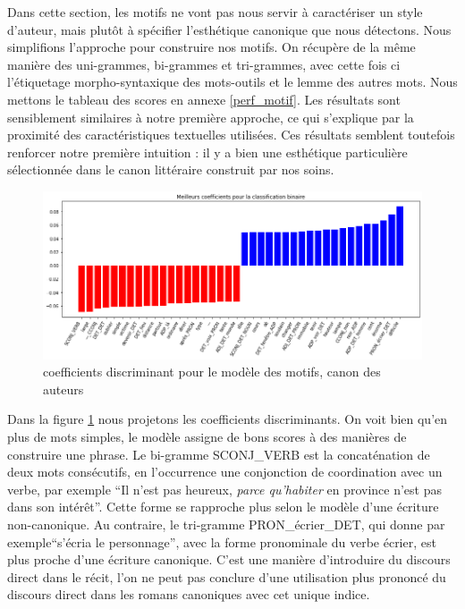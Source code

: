 Dans cette section, les motifs ne vont pas nous servir à caractériser un style d'auteur, mais plutôt à spécifier l'esthétique canonique que nous détectons. Nous simplifions l'approche pour construire nos motifs. On récupère de la même manière des uni-grammes, bi-grammes et tri-grammes, avec cette fois ci l'étiquetage morpho-syntaxique des mots-outils et le lemme des autres mots. 
Nous mettons le tableau des scores en annexe \ref{perf_motif}. Les résultats sont sensiblement similaires à notre première approche, ce qui s'explique par la proximité des caractéristiques textuelles utilisées. Ces résultats semblent toutefois renforcer notre première intuition : il y a bien une esthétique particulière sélectionnée dans le canon littéraire construit par nos soins. 

\bigskip
\begin{figure}[!ht]
    \centering
    \includegraphics[width=17cm]{img/14_coefs_motifs.png}
    \caption{coefficients discriminant pour le modèle des motifs, canon des auteurs}
    \label{coefs_motifs}
\end{figure}

Dans la figure \ref{coefs_motifs} nous projetons les coefficients discriminants. On voit bien qu'en plus de mots simples, le modèle assigne de bons scores à des manières de construire une phrase. Le bi-gramme SCONJ\_VERB est la concaténation de deux mots consécutifs, en l'occurrence une conjonction de coordination avec un verbe, par exemple \enquote{Il n'est pas heureux, \textit{parce qu'habiter} en province n'est pas dans son intérêt}. Cette forme se rapproche plus selon le modèle d'une écriture non-canonique. Au contraire, le tri-gramme PRON\_écrier\_DET, qui donne par exemple\enquote{s'écria le personnage}, avec la forme pronominale du verbe écrier, est plus proche d'une écriture canonique. C'est une manière d'introduire du discours direct dans le récit, l'on ne peut pas conclure d'une utilisation plus prononcé du discours direct dans les romans canoniques avec cet unique indice.

